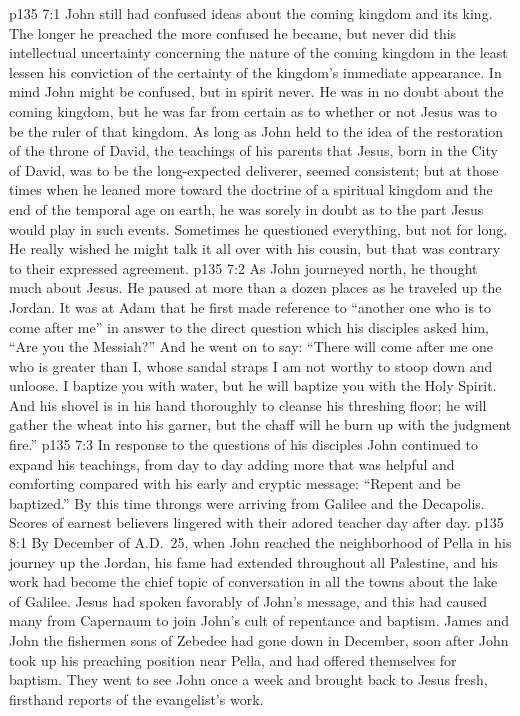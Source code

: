 \vs p135 7:1 John still had confused ideas about the coming kingdom and its king. The longer he preached the more confused he became, but never did this intellectual uncertainty concerning the nature of the coming kingdom in the least lessen his conviction of the certainty of the kingdom’s immediate appearance. In mind John might be confused, but in spirit never. He was in no doubt about the coming kingdom, but he was far from certain as to whether or not Jesus was to be the ruler of that kingdom. As long as John held to the idea of the restoration of the throne of David, the teachings of his parents that Jesus, born in the City of David, was to be the long\hyp{}expected deliverer, seemed consistent; but at those times when he leaned more toward the doctrine of a spiritual kingdom and the end of the temporal age on earth, he was sorely in doubt as to the part Jesus would play in such events. Sometimes he questioned everything, but not for long. He really wished he might talk it all over with his cousin, but that was contrary to their expressed agreement.\plusone
\pc \vs p135 7:2 As John journeyed north, he thought much about Jesus. He paused at more than a dozen places as he traveled up the Jordan. It was at Adam that he first made reference to “another one who is to come after me” in answer to the direct question which his disciples asked him, “Are you the Messiah?” And he went on to say: “There will come after me one who is greater than I, whose sandal straps I am not worthy to stoop down and unloose. I baptize you with water, but he will baptize you with the Holy Spirit. And his shovel is in his hand thoroughly to cleanse his threshing floor; he will gather the wheat into his garner, but the chaff will he burn up with the judgment fire.”
\vs p135 7:3 In response to the questions of his disciples John continued to expand his teachings, from day to day adding more that was helpful and comforting compared with his early and cryptic message: “Repent and be baptized.” By this time throngs were arriving from Galilee and the Decapolis. Scores of earnest believers lingered with their adored teacher day after day.
%
\vs p135 8:1 By December of A.D.~25, when John reached the neighborhood of Pella in his journey up the Jordan, his fame had extended throughout all Palestine, and his work had become the chief topic of conversation in all the towns about the lake of Galilee. Jesus had spoken favorably of John’s message, and this had caused many from Capernaum to join John’s cult of repentance and baptism. James and John the fishermen sons of Zebedee had gone down in December, soon after John took up his preaching position near Pella, and had offered themselves for baptism. They went to see John once a week and brought back to Jesus fresh, firsthand reports of the evangelist’s work.
